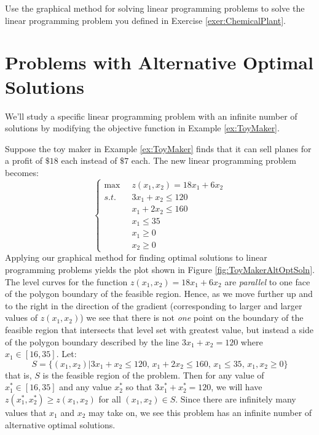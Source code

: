 \begin{exercise} Use the graphical method for solving linear programming problems to solve the linear programming problem you defined in Exercise \ref{exer:ChemicalPlant}.
\end{exercise}

\section{Problems with Alternative Optimal Solutions}
We'll study a specific linear programming problem with an infinite number of solutions by modifying the objective function in Example \ref{ex:ToyMaker}. 
\begin{example}
Suppose the toy maker in Example \ref{ex:ToyMaker} finds that it can sell planes for a profit of $\$18$ each instead of $\$7$ each. The new linear programming problem becomes:
\begin{equation}
\left\{
\begin{aligned}
\max\;\;& z(x_1,x_2) = 18x_1 + 6x_2\\
s.t.\;\;&  3x_1 + x_2 \leq 120\\
& x_1 + 2x_2 \leq 160\\
& x_1 \leq 35\\
& x_1 \geq 0\\
& x_2 \geq 0
\end{aligned}
\right.
\label{eqn:ToyMakerAltOptSoln}
\end{equation}
Applying our graphical method for finding optimal solutions to linear programming problems yields the plot shown in Figure \ref{fig:ToyMakerAltOptSoln}. The level curves for the function $z(x_1,x_2) = 18x_1 + 6x_2$ are \textit{parallel} to one face of the polygon boundary of the feasible region. Hence, as we move further up and to the right in the direction of the gradient (corresponding to larger and larger values of $z(x_1, x_2)$) we see that there is not \textit{one} point on the boundary of the feasible region that intersects that level set with greatest value, but instead a side of the polygon boundary described by the line $3x_1 + x_2 = 120$ where $x_1 \in [16, 35]$. Let:
\begin{displaymath}
S = \{(x_1,x_2) | 3x_1 + x_2 \leq 120,\,x_1 + 2x_2 \leq 160,\,x_1 \leq 35,\,x_1,x_2 \geq 0\}
\end{displaymath} 
that is, $S$ is the feasible region of the problem. Then for any value of $x_1^* \in [16,35]$ and any value $x_2^*$ so that  $3x_1^* + x_2^* = 120$, we will have $z(x_1^*, x_2^*) \geq z(x_1, x_2)$ for all $(x_1,x_2) \in S$. Since there are infinitely many values that $x_1$ and $x_2$  may take on, we see this problem has an infinite number of alternative optimal solutions.

\end{example}
